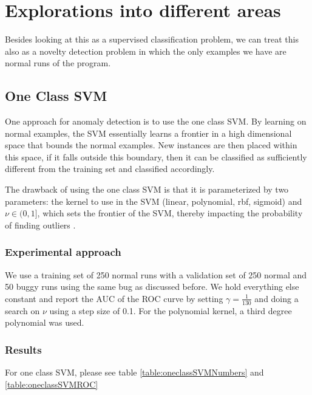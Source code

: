 \section{Explorations into different areas}

Besides looking at this as a supervised classification problem, we can
treat this also as a novelty detection problem in which the only
examples we have are normal runs of the program. 

\subsection{One Class SVM}

One approach for anomaly detection is to use the one class SVM. By
learning on normal examples, the SVM essentially learns a frontier
in a high dimensional space that bounds the normal examples. New
instances are then placed within this space, if it falls outside this
boundary, then it can be classified as sufficiently different from the
training set and classified accordingly.

The drawback of using the one class SVM is that it is parameterized by
two parameters: the kernel to use in the SVM (linear, polynomial, rbf,
sigmoid) and $\nu \in (0,1]$, which sets the frontier of the SVM,
  thereby impacting the probability of finding outliers
  \cite{scholkopf2001}.

\subsubsection{Experimental approach}
  
We use a training set of 250 normal runs with a validation set of 250
normal and 50 buggy runs using the same bug as discussed before. We
hold everything else constant and report the AUC of the ROC curve by
setting $\gamma = \frac{1}{130}$ and doing a search on $\nu$ using a
step size of 0.1. For the polynomial kernel, a third degree polynomial
was used. 

\subsubsection{Results}

For one class SVM, please see table \ref{table:oneclassSVMNumbers} and
\ref{table:oneclassSVMROC}

